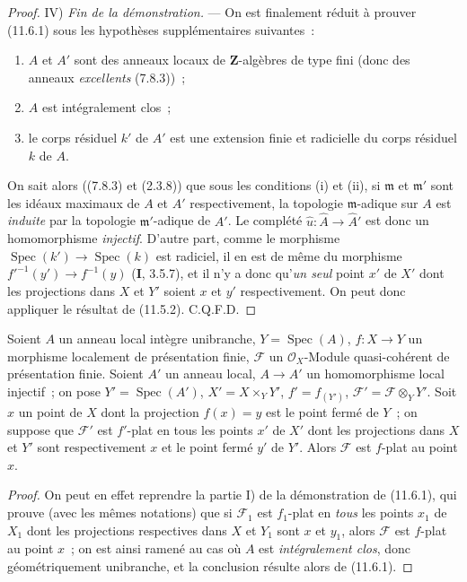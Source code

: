 \begin{proof}
\medskip
\noindent IV) \emph{Fin de la démonstration.} --- On est finalement
réduit à prouver (11.6.1) sous les hypothèses supplémentaires suivantes~:
\begin{enumerate}[label=(\roman*)]
  \item $A$ et $A'$ sont des anneaux locaux de $\mathbf Z$-algèbres de type fini
  (donc des anneaux \emph{excellents} (7.8.3))~;
  \item $A$ est intégralement clos~;
  \item le corps résiduel $k'$ de $A'$ est une extension finie et radicielle du
  corps résiduel $k$ de $A$.
\end{enumerate}

On sait alors ((7.8.3) et (2.3.8)) que sous les conditions (i) et (ii), si
$\mathfrak m$ et $\mathfrak m'$ sont les idéaux maximaux de $A$ et $A'$
respectivement, la topologie $\mathfrak m$-adique sur $A$ est \emph{induite} par la
topologie $\mathfrak m'$-adique de $A'$. Le complété
$\widehat u:\widehat A\to\widehat{A}'$ est donc un homomorphisme \emph{injectif}.
D'autre part, comme le morphisme
$\operatorname{Spec}(k')\to\operatorname{Spec}(k)$ est radiciel, il en est de
même du morphisme $f'^{-1}(y')\to f^{-1}(y)$ (\textbf I, 3.5.7), et il n'y a
donc qu'\emph{un seul} point $x'$ de $X'$ dont les projections dans $X$ et $Y'$ soient
$x$ et $y'$ respectivement. On peut donc appliquer le résultat de (11.5.2).
C.Q.F.D.
\end{proof}

\begin{corollary}[11.6.2]
\label{IV.11.6.2-fr}
Soient $A$ un anneau local intègre unibranche, $Y=\operatorname{Spec}(A)$,
$f:X\to Y$ un morphisme localement de présentation finie, $\mathcal F$ un
$\mathcal O_X$-Module quasi-cohérent de présentation finie. Soient $A'$ un
anneau local, $A\to A'$ un homomorphisme local injectif~; on pose
$Y'=\operatorname{Spec}(A')$, $X'=X\times_Y Y'$, $f'=f_{(Y')}$,
$\mathcal F'=\mathcal F\otimes_Y Y'$. Soit $x$ un point de $X$ dont la
projection $f(x)=y$ est le point fermé de $Y$~; on suppose que $\mathcal F'$ est
$f'$-plat en \textup{tous} les points $x'$ de $X'$ dont les projections dans $X$ et $Y'$
sont respectivement $x$ et le point fermé $y'$ de $Y'$. Alors $\mathcal F$ est
$f$-plat au point $x$.
\end{corollary}

\begin{proof}
On peut en effet reprendre la partie I) de la démonstration de (11.6.1), qui
prouve (avec les mêmes notations) que si $\mathcal F_1$ est $f_1$-plat en \emph{tous}
les points $x_1$ de $X_1$ dont les projections respectives dans $X$ et $Y_1$
sont $x$ et $y_1$, alors $\mathcal F$ est $f$-plat au point $x$~; on est ainsi
ramené au cas où $A$ est \emph{intégralement clos}, donc géométriquement unibranche, et
la conclusion résulte alors de (11.6.1).
\end{proof}

